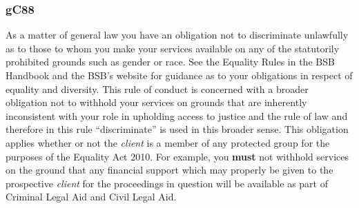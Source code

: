 

\subsubsection{\color{darkgrey}gC88}

As a matter of general law you have an obligation not to discriminate
unlawfully as to those to whom you make your services available on any
of the statutorily prohibited grounds such as gender or race. See the
Equality Rules in the BSB Handbook and the BSB's website for guidance as
to your obligations in respect of equality and diversity. This rule of
conduct is concerned with a broader obligation not to withhold your
services on grounds that are inherently inconsistent with your role in
upholding access to justice and the rule of law and therefore in this
rule ``discriminate'' is used in this broader sense. This obligation
applies whether or not the \emph{client} is a member of any protected
group for the purposes of the Equality Act 2010. For example, you \textcolor{myred}{\textbf{must}}
not withhold services on the ground that any financial support which may
properly be given to the prospective \emph{client} for the proceedings
in question will be available as part of Criminal Legal Aid and Civil
Legal Aid.





